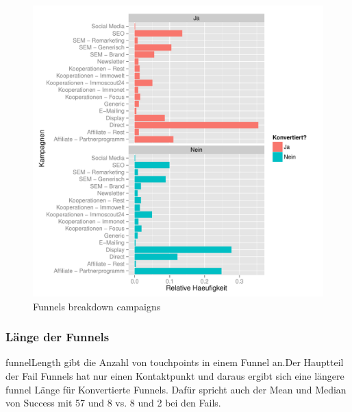     \begin{figure}[H]
        \centering
        \includegraphics[scale=0.5]{campaign.pdf}
        \caption{Funnels breakdown campaigns}
        \label{Fig_6}
    \end{figure}
    



\subsubsection*{Länge der Funnels}
funnelLength gibt die Anzahl von touchpoints in einem Funnel an.Der Hauptteil der Fail Funnels hat nur einen Kontaktpunkt und daraus ergibt sich eine längere funnel Länge für Konvertierte Funnels. Dafür spricht auch der Mean und Median von Success mit 57 und 8 vs. 8 und 2 bei den Fails. 


